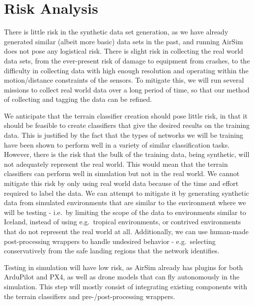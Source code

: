 \section{Risk Analysis}

There is little risk in the synthetic data set generation, as we have already generated similar
(albeit more basic) data sets in the past, and running AirSim does not pose any logistical risk.
There is slight risk in collecting the real world data sets, from the ever-present risk of damage
to equipment from crashes, to the difficulty in collecting data with high enough resolution and
operating within the motion/distance constraints of the sensors.
To mitigate this, we will run several missions to collect real world data over a long period of time,
so that our method of collecting and tagging the data can be refined.

We anticipate that the terrain classifier creation should pose little risk, in that it should be
feasible to create classifiers that give the desired results on the training data.
This is justified by the fact that the types of networks we will be training have been shown to
perform well in a variety of similar classification tasks.
However, there is the risk that the bulk of the training data, being synthetic, will not adequately
represent the real world.
This would mean that the terrain classifiers can perform well in simulation
but not in the real world.
We cannot mitigate this risk by only using real world data because of the time and effort
required to label the data.
We can attempt to mitigate it by generating synthetic data from simulated environments that are
similar to the environment where we will be testing - i.e.~by limiting the scope of the data
to environments similar to Iceland, instead of using e.g.~tropical environments,
or contrived environments that do not represent the real world at all.
Additionally, we can use human-made post-processing wrappers to handle undesired behavior -
e.g.~selecting conservatively from the safe landing regions that the network identifies.

Testing in simulation will have low risk, as AirSim already has plugins for both ArduPilot and PX4,
as well as drone models that can fly autonomously in the simulation.
This step will mostly consist of integrating existing components with the terrain classifiers and
pre-/post-processing wrappers.

